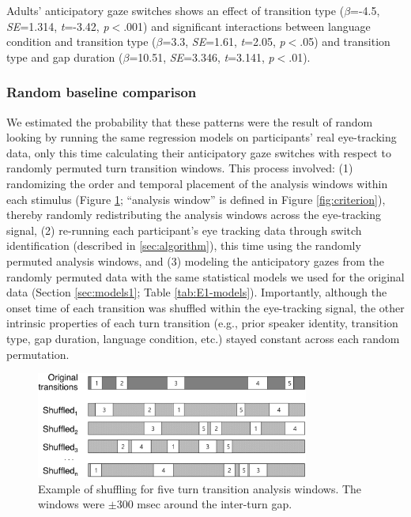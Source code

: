 \documentclass[authoryear, 12pt]{elsarticle}
\begin{document}
Adults' anticipatory gaze switches shows an effect of transition type (\textit{$\beta$}=-4.5, \textit{SE}=1.314, \textit{t}=-3.42, \textit{p}$<$.001) and significant interactions between language condition and transition type (\textit{$\beta$}=3.3, \textit{SE}=1.61, \textit{t}=2.05, \textit{p}$<$.05) and transition type and gap duration (\textit{$\beta$}=10.51, \textit{SE}=3.346, \textit{t}=3.141, \textit{p}$<$.01).

\subsubsection{Random baseline comparison}
\label{sec:randbaseline1}

We estimated the probability that these patterns were the result of random looking by running the same regression models on participants' real eye-tracking data, only this time calculating their anticipatory gaze switches with respect to randomly permuted turn transition windows. This process involved: (1) randomizing the order and temporal placement of the analysis windows within each stimulus (Figure \ref{fig:shuffling}; ``analysis window'' is defined in Figure \ref{fig:criterion}), thereby randomly redistributing the analysis windows across the eye-tracking signal, (2) re-running each participant's eye tracking data through switch identification (described in \ref{sec:algorithm}), this time using the randomly permuted analysis windows, and (3) modeling the anticipatory gazes from the randomly permuted data with the same statistical models we used for the original data (Section \ref{sec:models1}; Table \ref{tab:E1-models}). Importantly, although the onset time of each transition was shuffled within the eye-tracking signal, the other intrinsic properties of each turn transition (e.g., prior speaker identity, transition type, gap duration, language condition, etc.) stayed constant across each random permutation. 

\begin{figure}[ht!]
\begin{center}
\includegraphics[width=0.8\textwidth]{figures/FIG-ShuffledWindows.png}
\end{center}
\caption{Example of shuffling for five turn transition analysis windows. The windows were $\pm$300 msec around the inter-turn gap.} 
\label{fig:shuffling}
\end{figure}
\end{document}
